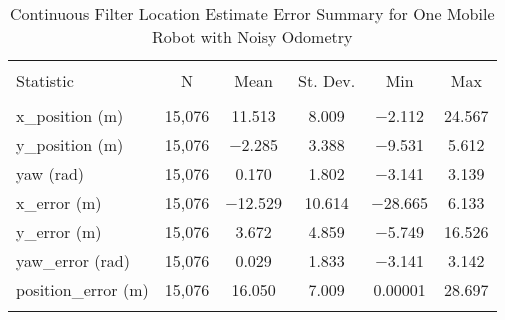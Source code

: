 
\begin{table}[htbp] \centering 
  \caption{Continuous Filter Location Estimate Error Summary for One Mobile Robot with Noisy Odometry} 
  \label{tab:one_mobile_continuous_summary} 
\begin{tabular}{@{\extracolsep{5pt}}lccccc} 
\\[-1.8ex]\hline 
\hline \\[-1.8ex] 
Statistic & \multicolumn{1}{c}{N} & \multicolumn{1}{c}{Mean} & \multicolumn{1}{c}{St. Dev.} & \multicolumn{1}{c}{Min} & \multicolumn{1}{c}{Max} \\ 
\hline \\[-1.8ex] 
x\_position (m) & 15,076 & \num{11.513} & \num{8.009} & \num{-2.112} & \num{24.567} \\ 
y\_position (m) & 15,076 & \num{-2.285} & \num{3.388} & \num{-9.531} & \num{5.612} \\ 
yaw (rad) & 15,076 & \num{0.170} & \num{1.802} & \num{-3.141} & \num{3.139} \\ 
x\_error (m) & 15,076 & \num{-12.529} & \num{10.614} & \num{-28.665} & \num{6.133} \\ 
y\_error (m) & 15,076 & \num{3.672} & \num{4.859} & \num{-5.749} & \num{16.526} \\ 
yaw\_error (rad) & 15,076 & \num{0.029} & \num{1.833} & \num{-3.141} & \num{3.142} \\ 
position\_error (m) & 15,076 & \num{16.050} & \num{7.009} & \num{0.00001} & \num{28.697} \\ 
\hline \\[-1.8ex] 
\end{tabular} 
\end{table} 
